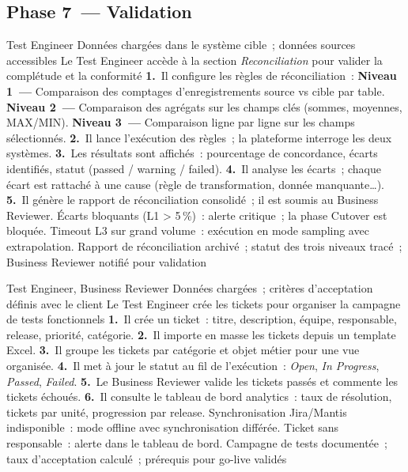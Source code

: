 \subsection*{Phase 7~--- Validation}

  {Test Engineer}
  {Données chargées dans le système cible~; données sources accessibles}
  {Le Test Engineer accède à la section \textit{Reconciliation} pour valider la complétude et la conformité}
  {\textbf{1.}~Il configure les règles de réconciliation~:\newline
   \quad\textbf{Niveau 1~---} Comparaison des comptages d'enregistrements source vs cible par table.\newline
   \quad\textbf{Niveau 2~---} Comparaison des agrégats sur les champs clés (sommes, moyennes, MAX/MIN).\newline
   \quad\textbf{Niveau 3~---} Comparaison ligne par ligne sur les champs sélectionnés.\newline
   \textbf{2.}~Il lance l'exécution des règles~; la plateforme interroge les deux systèmes.\newline
   \textbf{3.}~Les résultats sont affichés~: pourcentage de concordance, écarts identifiés, statut (passed / warning / failed).\newline
   \textbf{4.}~Il analyse les écarts~; chaque écart est rattaché à une cause (règle de transformation, donnée manquante\ldots).\newline
   \textbf{5.}~Il génère le rapport de réconciliation consolidé~; il est soumis au Business Reviewer.}
  {Écarts bloquants (L1 > 5\,\%)~: alerte critique~; la phase Cutover est bloquée. Timeout L3 sur grand volume~: exécution en mode sampling avec extrapolation.}
  {Rapport de réconciliation archivé~; statut des trois niveaux tracé~; Business Reviewer notifié pour validation}

  {Test Engineer, Business Reviewer}
  {Données chargées~; critères d'acceptation définis avec le client}
  {Le Test Engineer crée les tickets pour organiser la campagne de tests fonctionnels}
  {\textbf{1.}~Il crée un ticket~: titre, description, équipe, responsable, release, priorité, catégorie.\newline
   \textbf{2.}~Il importe en masse les tickets depuis un template Excel.\newline
   \textbf{3.}~Il groupe les tickets par catégorie et objet métier pour une vue organisée.\newline
   \textbf{4.}~Il met à jour le statut au fil de l'exécution~: \textit{Open}, \textit{In Progress}, \textit{Passed}, \textit{Failed}.\newline
   \textbf{5.}~Le Business Reviewer valide les tickets passés et commente les tickets échoués.\newline
   \textbf{6.}~Il consulte le tableau de bord analytics~: taux de résolution, tickets par unité, progression par release.}
  {Synchronisation Jira/Mantis indisponible~: mode offline avec synchronisation différée. Ticket sans responsable~: alerte dans le tableau de bord.}
  {Campagne de tests documentée~; taux d'acceptation calculé~; prérequis pour go-live validés}

